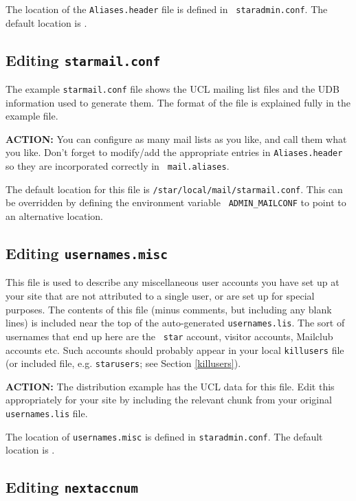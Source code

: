 The location of the {\tt Aliases.header} file is defined in {\tt
staradmin.conf}. The default location is .

\subsection{Editing {\tt starmail.conf}}
\label{starmailconf}

The example {\tt starmail.conf} file shows the UCL mailing list files and
the UDB information used to generate them. The format of the file is
explained fully in the example file.

{\large\bf ACTION:} You can configure as many mail lists as you like, and
call them what you like. Don't forget to modify/add the appropriate
entries in {\tt Aliases.header} so they are incorporated correctly in {\tt
mail.aliases}.

The default location for this file is {\tt /star/local/mail/starmail.conf}.
This can be overridden by defining the environment variable {\tt
ADMIN\_MAILCONF} to point to an alternative location.

\subsection{Editing {\tt usernames.misc}}
\label{usernames.misc}

This file is used to describe any miscellaneous user accounts you have set
up at your site that are not attributed to a single user, or are set up
for special purposes. The contents of this file (minus comments, but
including any blank lines) is included near the top of the auto-generated
{\tt usernames.lis}. The sort of usernames that end up here are the {\tt
star} account, visitor accounts, Mailclub accounts etc. Such accounts
should probably appear in your local {\tt killusers} file (or included
file, e.g. {\tt starusers}; see Section \ref{killusers}).

{\large\bf ACTION:} The distribution example has the UCL data for this
file. Edit this appropriately for your site by including the relevant
chunk from your original {\tt usernames.lis} file.

The location of {\tt usernames.misc} is defined in {\tt staradmin.conf}.
The default location is .

\subsection{Editing {\tt nextaccnum}}

